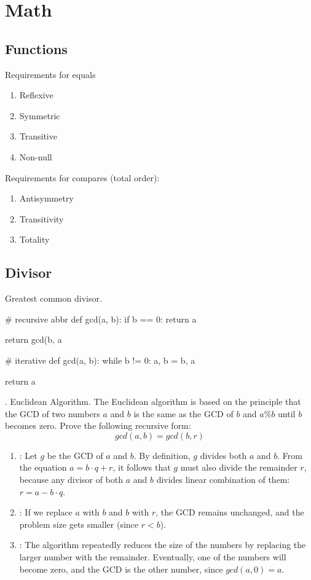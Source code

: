 \chapter{Math}

\section{Functions}
 Requirements for equals
\begin{enumerate}
\item Reflexive
\item Symmetric
\item Transitive
\item Non-null
\end{enumerate}
 Requirements for compares (total order):
\begin{enumerate}
\item Antisymmetry
\item Transitivity
\item Totality
\end{enumerate}
\section{Divisor}
 Greatest common divisor.

\begin{python}
# recursive abbr
def gcd(a, b):
    if b == 0:
        return a
        
    return gcd(b, a %

# iterative     
def gcd(a, b):
    while b != 0:
        a, b = b, a %

    return a
\end{python}

. Euclidean Algorithm. The Euclidean algorithm is based on the principle that the GCD of two numbers $a$ and $b$ is the same as the GCD of $b$ and $a\%b$ until $b$ becomes zero. Prove the following recursive form:
$$
gcd(a,b) = gcd(b, r)
$$
\begin{enumerate}
\item {}: Let $g$ be the GCD of $a$ and $b$. By definition, $g$ divides both $a$ and $b$. From the equation $a=b\cdot q+r$, it follows that $g$ must also divide the remainder $r$, because any divisor of both $a$ and $b$ divides linear combination of them: $r = a - b \cdot q$. 
\item {}: If we replace $a$ with $b$ and $b$ with $r$, the GCD remains unchanged, and the problem size gets smaller (since $r<b$). 
\item {}: The algorithm repeatedly reduces the size of the numbers by replacing the larger number with the remainder. Eventually, one of the numbers will become zero, and the GCD is the other number, since $gcd(a,0)=a$.
\end{enumerate}

